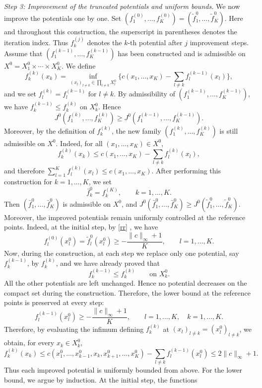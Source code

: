\documentclass[twoside,11pt,a4paper]{article}
\newcommand*{\SavedEqref}{}
\let\SavedEqref\eqref
\renewcommand*{\eqref}[1]{  \begingroup
    \hypersetup{
      linkcolor=linkequation,
      linkbordercolor=linkequation,
    }    \SavedEqref{#1}  \endgroup
}
\begin{document}
\medskip
\noindent\emph{Step 3: Improvement of the truncated potentials and uniform bounds.}
We now improve the potentials one by one. Set $
(f_1^{(0)},\ldots,f_K^{(0)})
=
(\widetilde f_1^0,\ldots,\widetilde f_K^0)$. Here and throughout this construction, the superscript in parentheses denotes the iteration index. Thus \(f_k^{(j)}\) denotes the \(k\)-th potential after \(j\) improvement steps.
Assume that \((f_1^{(k-1)},\ldots,f_K^{(k-1)})\) has been constructed and is
admissible on \(X^0=X_1^0\times\cdots\times X_K^0\). We define
\[
f_k^{(k)}(x_k)
=
\inf_{(x_l)_{l\ne k}\in \prod_{l\ne k}X_l^0}
\Big\{
c(x_1,\ldots,x_K)
-
\sum_{l\ne k}f_l^{(k-1)}(x_l)
\Big\},
\]
and we set $
f_l^{(k)}=f_l^{(k-1)}
\text{ for }l\ne k$.
By admissibility of \((f_1^{(k-1)},\ldots,f_K^{(k-1)})\), we have $
f_k^{(k-1)}\le f_k^{(k)}
\text{ on }X_k^0$.
Hence
\[
J^0(f_1^{(k)},\ldots,f_K^{(k)})
\ge
J^0(f_1^{(k-1)},\ldots,f_K^{(k-1)}).
\]
Moreover, by the definition of \(f_k^{(k)}\), the new family
\((f_1^{(k)},\ldots,f_K^{(k)})\) is still admissible on \(X^0\). Indeed, for all
\((x_1,\ldots,x_K)\in X^0\),
\[
f_k^{(k)}(x_k)
\le
c(x_1,\ldots,x_K)
-
\sum_{l\ne k}f_l^{(k)}(x_l),
\]
and therefore $
\sum_{l=1}^K f_l^{(k)}(x_l)\le c(x_1,\ldots,x_K)$.
After performing this construction for \(k=1,\ldots,K\), we set
\[
\bar f_k^0=f_k^{(K)},
\qquad k=1,\ldots,K.
\]
Then \((\bar f_1^0,\ldots,\bar f_K^0)\) is admissible on \(X^0\), and $
J^0(\bar f_1^0,\ldots,\bar f_K^0)
\ge
J^0(\widetilde f_1^0,\ldots,\widetilde f_K^0)$.
Moreover, the improved potentials remain uniformly controlled at the reference
points. Indeed, at the initial step, by \eqref{rr}, we have
\[
f_l^{(0)}(x_l^0)
=
\widetilde f_l^0(x_l^0)
\ge
-\frac{\|c\|_\infty+1}{K},
\qquad l=1,\ldots,K.
\]
Now, during the construction, at each step we replace only one potential, say
\(f_k^{(k-1)}\), by \(f_k^{(k)}\), and we have already proved that
\[
f_k^{(k-1)}\le f_k^{(k)}
\qquad\text{on }X_k^0.
\]
All the other potentials are left unchanged. Hence no potential decreases on
the compact set during the construction. Therefore, the lower bound at the
reference points is preserved at every step:
\[
f_l^{(k-1)}(x_l^0)
\ge
-\frac{\|c\|_\infty+1}{K},
\qquad l=1,\ldots,K,\quad k=1,\ldots,K.
\]
Therefore, by evaluating the infimum defining \(f_k^{(k)}\) at
\((x_l)_{l\ne k}=(x_l^0)_{l\ne k}\), we obtain, for every \(x_k\in X_k^0\),
\[
f_k^{(k)}(x_k)
\le
c(x_1^0,\ldots,x_{k-1}^0,x_k,x_{k+1}^0,\ldots,x_K^0)
-
\sum_{l\ne k}f_l^{(k-1)}(x_l^0)
\le
2\|c\|_\infty+1.
\]
Thus each improved potential is uniformly bounded from above.
For the lower bound, we argue by induction. At the initial step, the functions
\end{document}
